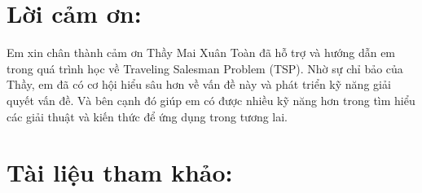 \documentclass[a4paper]{article}
\begin{document}

\newpage
\section{Lời cảm ơn: }
Em xin chân thành cảm ơn Thầy Mai Xuân Toàn đã hỗ trợ và hướng dẫn em trong quá trình học về Traveling Salesman Problem (TSP). Nhờ sự chỉ bảo của Thầy, em đã có cơ hội hiểu sâu hơn về vấn đề này và phát triển kỹ năng giải quyết vấn đề. Và bên cạnh đó giúp em có được nhiều kỹ năng hơn trong tìm hiểu các giải thuật và kiến thức để ứng dụng trong tương lai.

\newpage
\section{Tài liệu tham khảo: }


\end{document}
